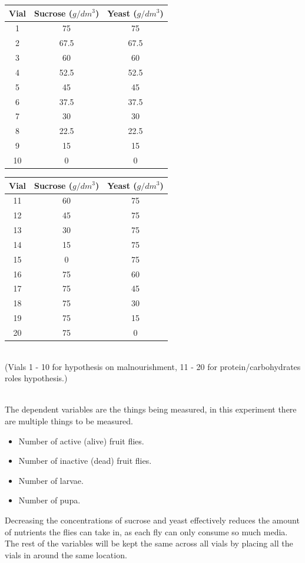\documentclass{article}
\begin{document}
{
\centering
\begin{tabular}{|c|c|c|}
  \hline
  Vial & Sucrose ($g/dm^3$) & Yeast ($g/dm^3$)\\
  \hline
  \hline
  1 & 75 & 75\\
  2 & 67.5 & 67.5\\
  3 & 60 & 60\\
  4 & 52.5 & 52.5\\
  5 & 45 & 45\\
  6 & 37.5 & 37.5\\
  7 & 30 & 30\\
  8 & 22.5 & 22.5\\
  9 & 15 & 15\\
  10 & 0 & 0\\
  \hline
\end{tabular}
\begin{tabular}{|c|c|c|}
  \hline
  Vial & Sucrose ($g/dm^3$) & Yeast ($g/dm^3$)\\
  \hline
  \hline
  11 & 60 & 75\\
  12 & 45 & 75\\
  13 & 30 & 75\\
  14 & 15 & 75\\
  15 & 0 & 75\\
  \hline
  16 & 75 & 60\\
  17 & 75 & 45\\
  18 & 75 & 30\\
  19 & 75 & 15\\
  20 & 75 & 0\\
  \hline
\end{tabular}
\par
}
\noindent\\
(Vials 1 - 10 for hypothesis on malnourishment, 11 - 20 for protein/carbohydrates roles hypothesis.)

\noindent\\
The dependent variables are the things being measured, in this experiment there are multiple things to be measured.

\begin{itemize}
    \item Number of active (alive) fruit flies.
    \item Number of inactive (dead) fruit flies.
    \item Number of larvae.
    \item Number of pupa.
\end{itemize}

\noindent
Decreasing the concentrations of sucrose and yeast effectively reduces the amount of nutrients the flies can take in, as each fly can only consume so much media. The rest of the variables will be kept the same across all vials by placing all the vials in around the same location.
\end{document}
